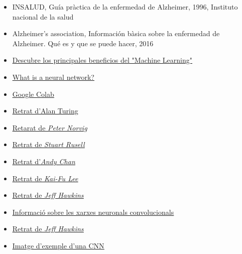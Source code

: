 \documentclass[a4paper,12pt]{article}
\begin{document}
\begin{itemize}
    \item INSALUD, Guía pràctica de la enfermedad de Alzheimer, 1996, Instituto nacional de la salud
    \item Alzheimer’s association, Información bàsica sobre la enfermedad de Alzheimer. Qué es y que se puede hacer, 2016
    \item \href{https://www.iberdrola.com/innovacion/machine-learning-aprendizaje-automatico}{\underline{Descubre los principales beneficios del "Machine Learning"}}
    \item \href{https://aws.amazon.com/es/what-is/neural-network/}{\underline{What is a neural network?}}
    \item \href{https://colab.research.google.com/}{\underline{Google Colab}}
    \item \href{https://upload.wikimedia.org/wikipedia/commons/a/a1/Alan_Turing_Aged_16.jpg}{\underline{Retrat d'Alan Turing}}
    \item \href{https://cs.berkeley.edu/sites/default/files/news_image/peter_norvig_speaking_at_university_of_california_berkeley_2013.jpg}{\underline{Retarat de \textit{Peter Norvig}}}
    \item \href{https://cs.berkeley.edu/sites/default/files/eecs_tout/russell-aqua.jpg}{\underline{Retrat de \textit{Stuart Rusell}}}
    \item \href{https://media.licdn.com/dms/image/C5603AQHgogiTxs2TZg/profile-displayphoto-shrink_800_800/0/1565701087600?e=2147483647&v=beta&t=p5ZjgearbT6mUGtGi2AEwDY07gaEWxmlGYDypO0HUVU}{\underline{Retrat d'\textit{Andy Chan}}}
    \item \href{https://upload.wikimedia.org/wikipedia/commons/0/0d/Capture_medium.jpg}{\underline{Retrat de \textit{Kai-Fu Lee}}}
    \item \href{https://m.media-amazon.com/images/W/IMAGERENDERING_521856-T1/images/S/amzn-author-media-prod/b2a43a485uokuohjp5l7peo9f0.jpg}{\underline{Retrat de \textit{Jeff Hawkins}}}
    \item \href{https://keepcoding.io/blog/redes-neuronales-convolucionales/#Que_son_las_Redes_Neuronales_Convolucionales}{\underline{Informació sobre les xarxes neuronals convolucionals}}
    \item \href{https://m.media-amazon.com/images/S/amzn-author-media-prod/b2a43a485uokuohjp5l7peo9f0._SX450_.jpg}{\underline{Retrat de \textit{Jeff Hawkins}}}
    \item \href{https://editor.analyticsvidhya.com/uploads/25366Convolutional_Neural_Network_to_identify_the_image_of_a_bird.png}{\underline{Imatge d'exemple d'una CNN}}
\end{itemize}
\end{document}

